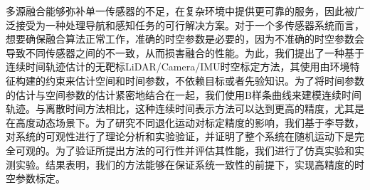
多源融合能够弥补单一传感器的不足，在复杂环境中提供更可靠的服务，因此被广泛接受为一种处理导航和感知任务的可行解决方案。对于一个多传感器系统而言，想要确保融合算法正常工作，准确的时空参数是必要的，因为不准确的时空参数会导致不同传感器之间的不一致，从而损害融合的性能。为此，我们提出了一种基于连续时间轨迹估计的无靶标LiDAR/Camera/IMU时空标定方法，其使用由环境特征构建的约束来估计空间和时间参数，不依赖目标或者先验知识。为了将时间参数的估计与空间参数的估计紧密地结合在一起，我们使用B样条曲线来建模连续时间轨迹。与离散时间方法相比，这种连续时间表示方法可以达到更高的精度，尤其是在高度动态场景下。为了研究不同退化运动对标定精度的影响，我们基于李导数，对系统的可观性进行了理论分析和实验验证，并证明了整个系统在随机运动下是完全可观的。为了验证所提出方法的可行性并评估其性能，我们进行了仿真实验和实测实验。结果表明，我们的方法能够在保证系统一致性的前提下，实现高精度的时空参数标定。